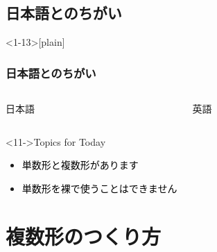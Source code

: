 \documentclass[aspectratio=169,xcolor={dvipsnames,table}]{beamer}
\begin{document}
\subsection{日本語とのちがい}
\begin{frame}<1-13>[plain]\frametitle{日本語とのちがい}
\begin{columns}
\begin{column}[t]{.55\textwidth}
\begin{alertblock}{日本語}



\end{alertblock}
\end{column}
\begin{column}[t]{.4\textwidth}
\begin{block}{英語}




\end{block}
\end{column}
\end{columns}

\begin{exampleblock}<11->{Topics for Today}
\begin{itemize}
 \item<12->  {\textcolor{black}{単数形と複数形があります}}
 \item<13->  {\textcolor{black}{単数形を裸で使うことはできません\,\,\dbend}}\\
\mbox{}
\end{itemize}
      \end{exampleblock}

\end{frame}

\section{複数形のつくり方}
\end{document}
